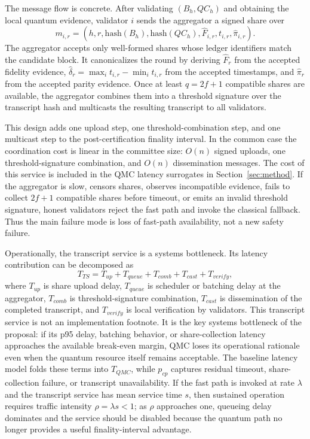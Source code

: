 \documentclass{ieeeaccess}
\begin{document}
The message flow is concrete. After validating $(B_h,QC_h)$ and obtaining the local quantum evidence, validator $i$ sends the aggregator a signed share over
\begin{equation}
m_{i,r}=\left(h,r,\mathrm{hash}(B_h),\mathrm{hash}(QC_h),\widehat{F}_{i,r},t_{i,r},\widehat{\pi}_{i,r}\right).
\label{eq:share}
\end{equation}
The aggregator accepts only well-formed shares whose ledger identifiers match the candidate block. It canonicalizes the round by deriving $\widehat{F}_r$ from the accepted fidelity evidence, $\widehat{\delta}_r=\max_i t_{i,r}-\min_i t_{i,r}$ from the accepted timestamps, and $\widehat{\pi}_r$ from the accepted parity evidence. Once at least $q=2f+1$ compatible shares are available, the aggregator combines them into a threshold signature over the transcript hash and multicasts the resulting transcript to all validators.

This design adds one upload step, one threshold-combination step, and one multicast step to the post-certification finality interval. In the common case the coordination cost is linear in the committee size: $O(n)$ signed uploads, one threshold-signature combination, and $O(n)$ dissemination messages. The cost of this service is included in the QMC latency surrogates in Section~\ref{sec:method}. If the aggregator is slow, censors shares, observes incompatible evidence, fails to collect $2f+1$ compatible shares before timeout, or emits an invalid threshold signature, honest validators reject the fast path and invoke the classical fallback. Thus the main failure mode is loss of fast-path availability, not a new safety failure.

Operationally, the transcript service is a systems bottleneck. Its latency contribution can be decomposed as
\begin{equation}
T_{TS}=T_{up}+T_{queue}+T_{comb}+T_{cast}+T_{verify},
\label{eq:tts}
\end{equation}
where $T_{up}$ is share upload delay, $T_{queue}$ is scheduler or batching delay at the aggregator, $T_{comb}$ is threshold-signature combination, $T_{cast}$ is dissemination of the completed transcript, and $T_{verify}$ is local verification by validators. This transcript service is not an implementation footnote. It is the key systems bottleneck of the proposal: if its p95 delay, batching behavior, or share-collection latency approaches the available break-even margin, QMC loses its operational rationale even when the quantum resource itself remains acceptable. The baseline latency model folds these terms into $T_{QMC}$, while $p_{cp}$ captures residual timeout, share-collection failure, or transcript unavailability. If the fast path is invoked at rate $\lambda$ and the transcript service has mean service time $s$, then sustained operation requires traffic intensity $\rho=\lambda s<1$; as $\rho$ approaches one, queueing delay dominates and the service should be disabled because the quantum path no longer provides a useful finality-interval advantage.
\end{document}
